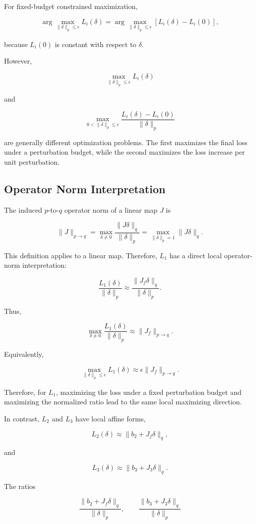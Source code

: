 \documentclass{article}
\begin{document}
For fixed-budget constrained maximization,

\[
\arg\max_{\|\delta\|_p\le \epsilon} L_i(\delta)
=
\arg\max_{\|\delta\|_p\le \epsilon}
\left[L_i(\delta)-L_i(0)\right],
\]

because \(L_i(0)\) is constant with respect to \(\delta\).

However,

\[
\max_{\|\delta\|_p\le \epsilon} L_i(\delta)
\]

and

\[
\max_{0<\|\delta\|_p\le \epsilon}
\frac{L_i(\delta)-L_i(0)}{\|\delta\|_p}
\]

are generally different optimization problems. The first maximizes the final loss under a perturbation budget, while the second maximizes the loss increase per unit perturbation.

\subsection{Operator Norm Interpretation}

The induced \(p\)-to-\(q\) operator norm of a linear map \(J\) is

\[
\|J\|_{p\to q}
=
\max_{\delta\neq 0}
\frac{\|J\delta\|_q}{\|\delta\|_p}
=
\max_{\|\delta\|_p=1}
\|J\delta\|_q.
\]

This definition applies to a linear map. Therefore, \(L_1\) has a direct local operator-norm interpretation:

\[
\frac{L_1(\delta)}{\|\delta\|_p}
\approx
\frac{\|J_f\delta\|_q}{\|\delta\|_p}.
\]

Thus,

\[
\max_{\delta\neq 0}
\frac{L_1(\delta)}{\|\delta\|_p}
\approx
\|J_f\|_{p\to q}.
\]

Equivalently,

\[
\max_{\|\delta\|_p\le \epsilon}
L_1(\delta)
\approx
\epsilon \|J_f\|_{p\to q}.
\]

Therefore, for \(L_1\), maximizing the loss under a fixed perturbation budget and maximizing the normalized ratio lead to the same local maximizing direction.

In contrast, \(L_2\) and \(L_3\) have local affine forms,

\[
L_2(\delta)
\approx
\|b_2+J_f\delta\|_q,
\]

and

\[
L_3(\delta)
\approx
\|b_3+J_3\delta\|_q.
\]

The ratios

\[
\frac{\|b_2+J_f\delta\|_q}{\|\delta\|_p},
\qquad
\frac{\|b_3+J_3\delta\|_q}{\|\delta\|_p}
\]
\end{document}
